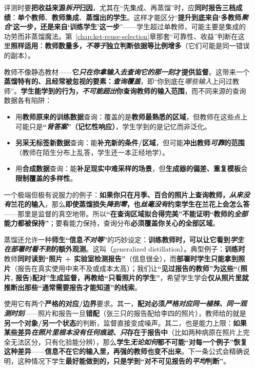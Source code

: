 评测时要\textbf{把收益来源\emph{拆开}归因}，尤其在“先集成、再蒸馏”时，应\textbf{同时报告三档成绩}：\textbf{单个教师}、\textbf{教师集成}、\textbf{蒸馏出的学生}。这样才能区分“\textbf{提升到底来自‘多教师\emph{聚合}’这一步，还是来自‘训练学生’这一步}”——学生超过单教师，可能主要是集成的功劳而非蒸馏魔法。第~\ref{chap:ket-reuse-selection}章那套“可靠性、收益”判断在这里\textbf{照样适用}：\textbf{教师数量多，\emph{不等于}独立判断依据等比例增多}（它们可能是同一错误的副本）。

教师不像静态教材——\textbf{它\emph{只在你拿输入去\emph{查询}它的那一刻}才提供监督}。这带来一个\textbf{蒸馏特有的、且经常被忽视的要素：\emph{查询覆盖}}，即“你到底在\emph{哪些输入}上问过教师”。\textbf{学生能学到的行为，\emph{不可能超出}你查询教师的输入范围}，而不同来源的查询数据各有陷阱：
\begin{itemize}\item 用\textbf{教师原来的训练数据}查询：覆盖的是\textbf{教师最熟悉的区域}，但教师在这些点上可能只是\textbf{“\emph{背答案}”（记忆性响应）}，学生学到的是记忆而非泛化。\item \textbf{另采无标签新数据}查询：能\textbf{补充新的条件/区域}，但可能\textbf{冲出教师\emph{可靠}的范围}（教师在陌生分布上乱答，学生还一本正经地学）。\item 用\textbf{合成数据}查询：能\textbf{补足现实中难采样的场景}，但\textbf{生成器的偏差、重复模板}会\textbf{限制覆盖的多样性}。\end{itemize}
一个极端但极有说服力的例子：\textbf{如果你只在月季、百合的照片上查询教师，\emph{从来没有}兰花的输入}，那么\textbf{即使蒸馏损失\emph{降到零}，也\emph{丝毫没有}约束学生在兰花上会怎么答}——那里是监督的真空地带。所以\textbf{“在查询区域拟合得完美”\textbf{不能证明}“教师的\emph{全部}能力都被保持”}；要看能力保持，查询分布\textbf{必须覆盖你关心的全部区域}。

蒸馏还允许一种\textbf{师生“信息\emph{不对等}”}的巧妙设定：\textbf{训练教师时，可以让它看到\emph{学生在部署时\emph{看不到}}的额外观测}。这叫（generalized distillation）。典型例子：\textbf{训练时}教师\textbf{同时读到“照片 + 实验室检测报告”}（信息很全），而\textbf{部署时学生只能拿到照片}（报告在真实使用中来不及或成本太高）；我们让\textbf{“见过报告的教师”为这些“(照片, 报告)配对”生成监督，再教给“只看照片的学生”}，希望学生学会\textbf{仅从照片里就推断出那些“通常需要报告才能知道”的线索}。

使用它有两个\textbf{严格的对应/边界}要求。其一，\textbf{配对必须\emph{严格对应同一植株、同一观测时刻}}——照片和报告一旦\textbf{错配}（张三只的报告配给李四的照片），教师给的就是\textbf{另一个对象/另一个状态}的判断，监督直接变成噪声。其二，也是能力上限：\textbf{如果某些差异\emph{在照片里\emph{根本没有}任何痕迹}、\emph{只}存在于报告中}（比如两种病原在照片上完全无法区分，只有化验能分辨），那么\textbf{学生\emph{无论如何}都不可能“对每一个例子”恢复这种差异}——\textbf{信息不在它的输入里，再强的教师也变不出来}。下一条公式会精确说明，这种情况下学生\textbf{最好能做到的，只是学到“对不可见报告的\emph{平均}判断”}。

